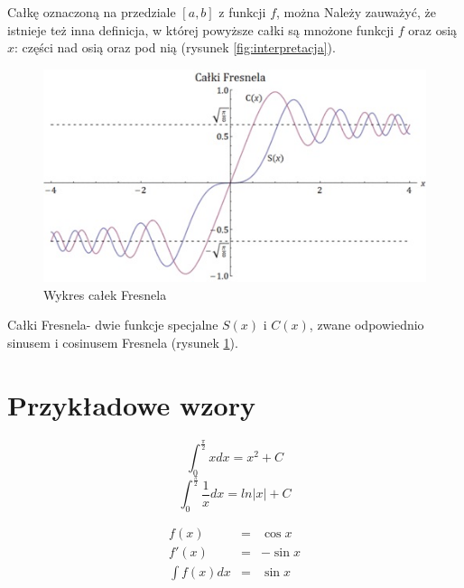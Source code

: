 \documentclass{article}
\begin{document}
Całkę oznaczoną na przedziale $[a, b]$ z funkcji $f$, można Należy zauważyć, że istnieje też inna definicja, w której powyższe całki są mnożone funkcji $f$ oraz osią $x$: części nad osią oraz pod nią (rysunek \ref{fig:interpretacja}).

\begin{figure}
\caption{Wykres całek Fresnela}
\label{fig:fresnel}
\includegraphics[scale=0.6]{calka2.png}
\centering
\end{figure}

Całki Fresnela- dwie funkcje specjalne $S(x)$ i $C(x)$, zwane odpowiednio sinusem i cosinusem Fresnela (rysunek \ref{fig:fresnel}).

\section{Przykładowe wzory}
$$\int_{0}^{\frac{\pi}{2}}xdx=x^{2}+C$$
$$\int_{0}^{\frac{\pi}{2}}\frac{1}{x}dx=ln|x|+C$$

\begin{eqnarray*}
f(x) & = & \cos x \\
f'(x) & = & -\sin x \\
\int f(x)dx &
= & \sin x
\end{eqnarray*}
\end{document}
